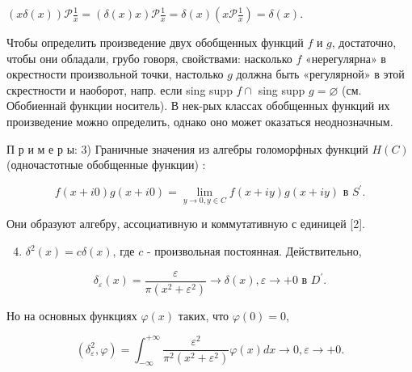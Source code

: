 \documentclass[10pt]{article}
\begin{document}
$(x \delta(x)) \mathscr{P} \frac{1}{x}=(\delta(x) x) \mathscr{P} \frac{1}{x}=\delta(x)\left(x \mathscr{P} \frac{1}{x}\right)=\delta(x)$.



Чтобы определить произведение двух обобщенных функций $f$ и $g$, достаточно, чтобы они обладали, грубо говоря, свойствами: насколько $f$ «нерегулярна» в окрестности произвольной точки, настолько $g$ должна быть «регулярной» в этой скрестности и наоборот, напр. если sing supp $f \cap$ sing supp $g=\varnothing$ (см. Обобиеннай функции носитель). В нек-рых классах обобщенных функций их произведение можно определить, однако оно может оказаться неоднозначным.



П р и м е р ы: 3) Граничные значения из алгебры голоморфных функций $H(C)$ (одночастотные обобщенные функции) :



\[

f(x+i 0) g(x+i 0)=\lim _{y \rightarrow 0, y \in C} f(x+i y) g(x+i y) \text { в } S^{\prime} .

\]



Они образуют алгебру, ассоциативную и коммутативную с единицей [2].



\begin{enumerate}

  \setcounter{enumi}{3}

  \item $\delta^{2}(x)=c \delta(x)$, где $c$ - произвольная постоянная. Действительно,

\end{enumerate}



\[

\delta_{\varepsilon}(x)=\frac{\varepsilon}{\pi\left(x^{2}+\varepsilon^{2}\right)} \rightarrow \delta(x), \varepsilon \rightarrow+0 \text { в } D^{\prime} .

\]



Но на основных функциях $\varphi(x)$ таких, что $\varphi(0)=0$,



\[

\left(\delta_{\varepsilon}^{2}, \varphi\right)=\int_{-\infty}^{+\infty} \frac{\varepsilon^{2}}{\pi^{2}\left(x^{2}+\varepsilon^{2}\right)} \varphi(x) d x \rightarrow 0, \varepsilon \rightarrow+0 .

\]
\end{document}
